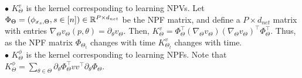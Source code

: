 $\bullet$ $K^v_{\Theta}$ is the kernel corresponding to learning NPVs. Let $\Phi_{\Theta}=\left(\phi_{x_s,\Theta},s\in[n]\right)\in\mathbb{R}^{P\times d_{net}}$ be the NPF matrix, and define a $P\times d_{net}$ matrix with entries $\nabla_{\Theta}v_{\Theta}(p,\theta)=\partial_{\theta}v_{\Theta}$. Then, $K^v_{\Theta}=\Phi^\top_{\Theta}(\nabla_{\Theta}v_{\Theta})(\nabla_{\Theta}v_{\Theta})^\top \Phi^\top_{\Theta}$. Thus, as the NPF matrix $\Phi_{\Theta_t}$ changes with time $K^v_{\Theta_t}$ changes with time.\\
$\bullet$ $K^{\phi}_{\Theta}$ is the kernel corresponding to learning NPFs. Note that $K^{\phi}_{\Theta}=\sum_{\theta\in\Theta}\partial_{\theta}\Phi^\top_{\Theta}vv^\top\partial_{\theta}\Phi_{\Theta}$.
